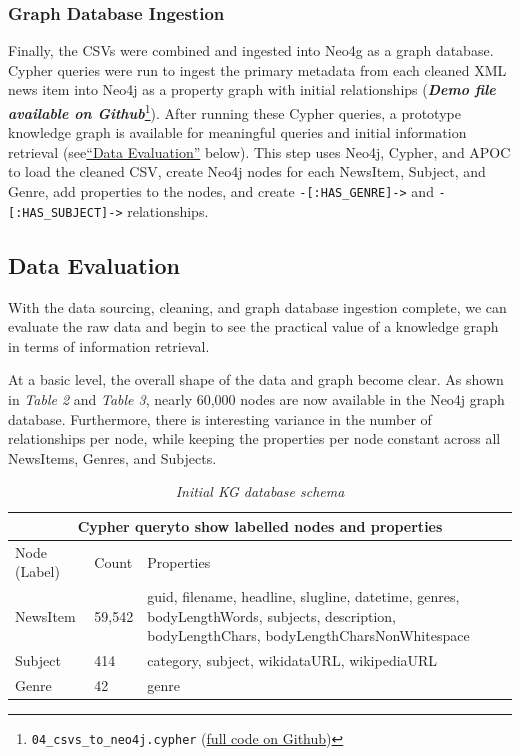 \documentclass[11pt]{article}
\begin{document}
    \subsubsection{Graph Database Ingestion}

    Finally, the CSVs were combined and ingested into Neo4g as a graph database. Cypher queries were run to ingest the primary metadata from each cleaned XML news item into Neo4j as a property graph with initial relationships (\textit{\textbf{Demo file available on Github}}\footnote{\lstinline{04_csvs_to_neo4j.cypher} (\href{https://github.com/Birkbeck/msc-data-science-project-2020_21---files-heychrisek/}{full code on Github})}). After running these Cypher queries, a prototype knowledge graph is available for meaningful queries and initial information retrieval (see\hyperref[sec:DataSetEvaluation]{``Data Evaluation''} below). This step uses Neo4j, Cypher, and APOC to load the cleaned CSV, create Neo4j nodes for each NewsItem, Subject, and Genre, add properties to the nodes, and create \lstinline{-[:HAS_GENRE]->} and \lstinline{-[:HAS_SUBJECT]->} relationships.


  \subsection{Data Evaluation}
  \label{sec:DataSetEvaluation}

  With the data sourcing, cleaning, and graph database ingestion complete, we can evaluate the raw data and begin to see the practical value of a knowledge graph in terms of information retrieval.

  At a basic level, the overall shape of the data and graph become clear. As shown in \textit{Table 2} and \textit{Table 3}, nearly 60,000 nodes are now available in the Neo4j graph database. Furthermore, there is interesting variance in the number of relationships per node, while keeping the properties per node constant across all NewsItems, Genres, and Subjects.

  \begin{table}
    \begin{tabular}{ |p{3cm}||p{2cm}|p{7cm}|  }
    \hline
    \multicolumn{3}{|c|}{Cypher query\protect \footnotemark to show labelled nodes and properties} \\
    \hline
    Node (Label)& Count &Properties\\
    \hline
    NewsItem&59,542&guid, filename, headline, slugline, datetime, genres, bodyLengthWords, subjects, description, bodyLengthChars, bodyLengthCharsNonWhitespace\\
    \hline
    Subject&414&category, subject, wikidataURL, wikipediaURL\\
    \hline
    Genre&42&genre\\
    \hline
    \end{tabular}
    \caption{\textit{Initial KG database schema}}
  \end{table}
\end{document}
